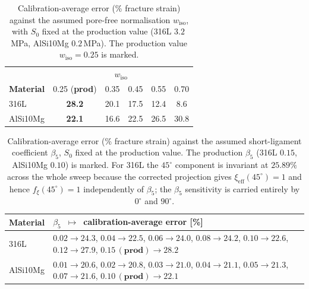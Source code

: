 \documentclass[11pt,a4paper,twocolumn]{article}
\providecommand{\ang}[1]{\ensuremath{#1^{\circ}}}
\begin{document}
\begin{table}[htbp]
\centering
\caption{Calibration-average error (\% fracture strain) against the assumed pore-free normalisation $w_{\mathrm{iso}}$, with $S_0$ fixed at the production value (316L $3.2$\,MPa, AlSi10Mg $0.2$\,MPa). The production value $w_{\mathrm{iso}} = 0.25$ is marked.}
\label{tab:si_wiso}
\footnotesize
\setlength{\tabcolsep}{4pt}
\begin{tabular}{lccccc}
\toprule
 & \multicolumn{5}{c}{$w_{\mathrm{iso}}$} \\
\textbf{Material} & 0.25 (\textbf{prod}) & 0.35 & 0.45 & 0.55 & 0.70 \\
\midrule
316L     & \textbf{28.2} & 20.1 & 17.5 & 12.4 & 8.6 \\
AlSi10Mg & \textbf{22.1} & 16.6 & 22.5 & 26.5 & 30.8 \\
\bottomrule
\end{tabular}
\end{table}

\begin{table}[htbp]
\centering
\caption{Calibration-average error (\% fracture strain) against the assumed short-ligament coefficient $\beta_5$, $S_0$ fixed at the production value. The production $\beta_5$ (316L $0.15$, AlSi10Mg $0.10$) is marked. For 316L the $\ang{45}$ component is invariant at $25.89\%$ across the whole sweep because the corrected projection gives $\xi_{\mathrm{eff}}(\ang{45}) = 1$ and hence $f_\xi(\ang{45}) = 1$ independently of $\beta_5$; the $\beta_5$ sensitivity is carried entirely by $\ang{0}$ and $\ang{90}$.}
\label{tab:si_beta5}
\footnotesize
\setlength{\tabcolsep}{4pt}
\begin{tabular}{lp{}}
\toprule
\textbf{Material} & $\beta_5$~$\mapsto$~calibration-average error [\%] \\
\midrule
316L     & $0.02\!\to\!24.3$, $0.04\!\to\!22.5$, $0.06\!\to\!24.0$, $0.08\!\to\!24.2$, $0.10\!\to\!22.6$, $0.12\!\to\!27.9$, $\mathbf{0.15\,(\textbf{prod})\!\to\!28.2}$ \\
AlSi10Mg & $0.01\!\to\!20.6$, $0.02\!\to\!20.8$, $0.03\!\to\!21.0$, $0.04\!\to\!21.1$, $0.05\!\to\!21.3$, $0.07\!\to\!21.6$, $\mathbf{0.10\,(\textbf{prod})\!\to\!22.1}$ \\
\bottomrule
\end{tabular}
\end{table}
\end{document}
